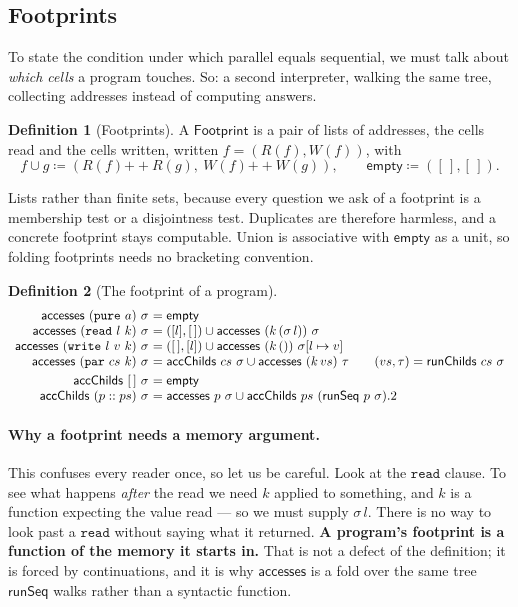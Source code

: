 \documentclass[11pt,a4paper]{article}
\theoremstyle{definition}
\newtheorem{definition}{Definition}
\theoremstyle{plain}
\theoremstyle{remark}
\newcommand{\st}{\sigma}
\newcommand{\reads}[1]{R(#1)}
\newcommand{\writes}[1]{W(#1)}
\newcommand{\acc}{\mathsf{accesses}}
\newcommand{\runSeq}{\mathsf{runSeq}}
\newcommand{\upd}[3]{#1[#2 \mapsto #3]}
\begin{document}
\subsection{Footprints}\label{sec:indep:fp}

To state the condition under which parallel equals sequential, we must talk about
\emph{which cells} a program touches. So: a second interpreter, walking the same tree,
collecting addresses instead of computing answers.

\begin{definition}[Footprints]\label{def:footprint}
A $\mathsf{Footprint}$ is a pair of lists of addresses, the cells read and the cells
written, written $f = (\reads{f}, \writes{f})$, with
\[
  f \cup g \coloneqq (\reads{f} \mathbin{+\!\!+} \reads{g},\ \writes{f} \mathbin{+\!\!+} \writes{g}),
  \qquad \mathsf{empty} \coloneqq ([\,],[\,]) .
\]
\end{definition}

Lists rather than finite sets, because every question we ask of a footprint is a membership
test or a disjointness test. Duplicates are therefore harmless, and a concrete footprint
stays computable. Union is associative with $\mathsf{empty}$ as a unit, so folding
footprints needs no bracketing convention.

\begin{definition}[The footprint of a program]\label{def:acc}
\[
\begin{array}{r@{\ }l}
  \acc\ (\texttt{pure}\ a)\ \st &= \mathsf{empty} \\
  \acc\ (\texttt{read}\ l\ k)\ \st &= ([l],[\,]) \cup \acc\ (k\,(\st\,l))\ \st \\
  \acc\ (\texttt{write}\ l\ v\ k)\ \st &= ([\,],[l]) \cup \acc\ (k\,())\ \upd{\st}{l}{v} \\
  \acc\ (\texttt{par}\ cs\ k)\ \st &= \mathsf{accChilds}\ cs\ \st \cup \acc\ (k\,vs)\ \tau
    \qquad (vs,\tau) = \mathsf{runChilds}\ cs\ \st \\[3pt]
  \mathsf{accChilds}\ [\,]\ \st &= \mathsf{empty} \\
  \mathsf{accChilds}\ (p :: ps)\ \st &= \acc\ p\ \st \cup \mathsf{accChilds}\ ps\ (\runSeq\ p\ \st).2
\end{array}
\]
\end{definition}

\paragraph{Why a footprint needs a memory argument.}
This confuses every reader once, so let us be careful. Look at the $\texttt{read}$ clause.
To see what happens \emph{after} the read we need $k$ applied to something, and $k$ is a
function expecting the value read --- so we must supply $\st\,l$. There is no way to look
past a $\texttt{read}$ without saying what it returned. \textbf{A program's footprint is a
function of the memory it starts in.} That is not a defect of the definition; it is forced
by continuations, and it is why $\acc$ is a fold over the same tree $\runSeq$ walks rather
than a syntactic function.
\end{document}
